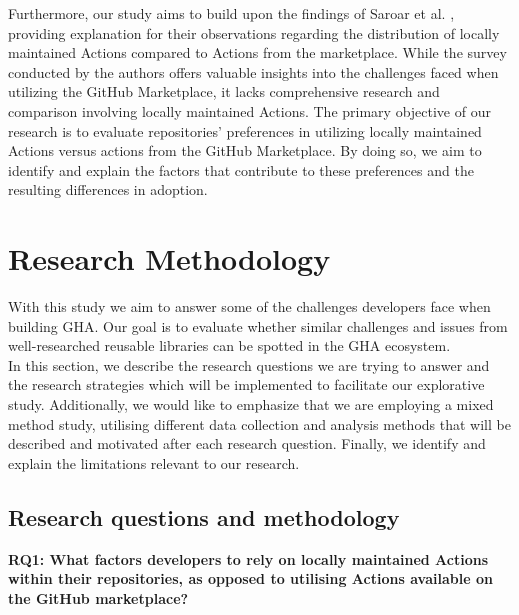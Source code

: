 \documentclass[conference]{IEEEtran}
\begin{document}
	Furthermore, our study aims to build upon the findings of Saroar et al. \cite{saroar2023developers}, providing explanation for their observations regarding the distribution of locally maintained Actions compared to Actions from the marketplace. While the survey conducted by the authors offers valuable insights into the challenges faced when utilizing the GitHub Marketplace, it lacks comprehensive research and comparison involving locally maintained Actions. The primary objective of our research is to evaluate repositories' preferences in utilizing locally maintained Actions versus actions from the GitHub Marketplace. By doing so, we aim to identify and explain the factors that contribute to these preferences and the resulting differences in adoption.




\section{Research Methodology}
    With this study we aim to answer some of the challenges developers face when building GHA. Our goal is to evaluate whether similar challenges and issues from well-researched reusable libraries can be spotted in the GHA ecosystem.\\

    In this section, we describe the research questions we are trying to answer and the research strategies which will be implemented to facilitate our explorative study. Additionally, we would like to emphasize that we are employing a mixed method study, utilising different data collection and analysis methods that will be described and motivated after each research question. Finally, we identify and explain the limitations relevant to our research.

    \subsection{Research questions and methodology}
        \textbf{RQ1: What factors developers to rely on locally maintained Actions within their repositories, as opposed to utilising Actions available on the GitHub marketplace?}
        \\
\end{document}

